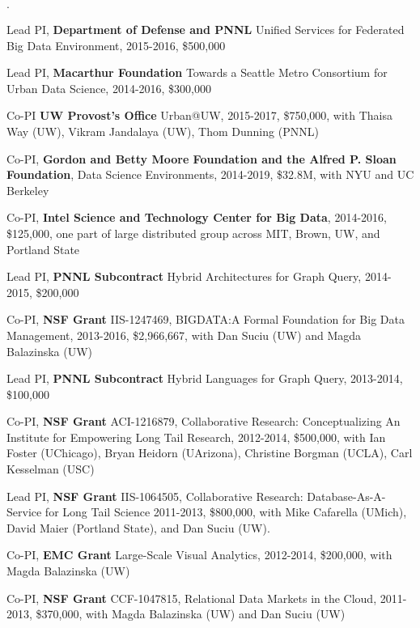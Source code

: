 \documentclass[10pt]{article}
\newenvironment{bulletlist}
   {
      \begin{list}
         {$\cdot$}
         {
            \setlength{\itemsep}{.5ex}
            \setlength{\parsep}{0ex}
            \setlength{\leftmargin}{0.7em}
            \setlength{\parskip}{0ex}
            \setlength{\topsep}{0ex}
         }
   }
   {
      \end{list}
   }
\newcommand{\marginlabel}[1]{
\begin{minipage}[b]{0.8\labelwidth}{\large \textsf{\textbf{#1}}}\end{minipage}}
\newcommand{\entrylabel}[1]{\mbox{\marginlabel{#1}}\hfill}
\newcommand{\MainListlabel}[1]
   {
      \parbox[t]{\labelwidth}{\hspace{.8em}\marginlabel{#1}}
   }
\newenvironment{MainList}[1]
   {
      \renewcommand{\entrylabel}{\MainListlabel}
      \begin{list}{}
      {
         \renewcommand{\makelabel}{\entrylabel}
         \setlength   {\itemindent}{-.65em}
         \setlength   {\labelwidth}{#1}
         \setlength   {\leftmargin}{\labelwidth}
         \setlength   {\itemsep}{3ex}
      }
   }
   {
      \end{list}
   }
\begin{document}
\begin{MainList}{88pt}
\begin{bulletlist}
\item Lead PI, {\bf Department of Defense and PNNL} Unified Services for Federated Big Data Environment, 2015-2016, \$500,000

\item Lead PI, {\bf Macarthur Foundation} Towards a Seattle Metro Consortium for Urban Data Science, 2014-2016, \$300,000

\item Co-PI {\bf UW Provost's Office} Urban@UW, 2015-2017, \$750,000, with Thaisa Way (UW), Vikram Jandalaya (UW), Thom Dunning (PNNL)

\item Co-PI, {\bf Gordon and Betty Moore Foundation and the Alfred P. Sloan Foundation}, Data Science Environments, 2014-2019, \$32.8M, with NYU and UC Berkeley

\item Co-PI, {\bf Intel Science and Technology Center for Big Data}, 2014-2016, \$125,000, one part of large distributed group across MIT, Brown, UW, and Portland State

\item Lead PI, {\bf PNNL Subcontract} Hybrid Architectures for Graph Query, 2014-2015, \$200,000

\item Co-PI, {\bf NSF Grant} IIS-1247469, BIGDATA:A Formal Foundation for Big Data Management, 2013-2016, \$2,966,667, with Dan Suciu (UW) and Magda Balazinska (UW)

\item Lead PI, {\bf PNNL Subcontract} Hybrid Languages for Graph Query, 2013-2014, \$100,000

\item Co-PI, {\bf NSF Grant} ACI-1216879, Collaborative Research: Conceptualizing An Institute for Empowering Long Tail Research, 2012-2014, \$500,000, with Ian Foster (UChicago), Bryan Heidorn (UArizona), Christine Borgman (UCLA), Carl Kesselman (USC)

\item Lead PI, {\bf NSF Grant} IIS-1064505, Collaborative Research: Database-As-A-Service for Long Tail Science
2011-2013, \$800,000, with Mike Cafarella (UMich), David Maier (Portland State), and Dan Suciu (UW).

\item Co-PI, {\bf EMC Grant} Large-Scale Visual Analytics, 2012-2014, \$200,000, with Magda Balazinska (UW)

\item Co-PI, {\bf NSF Grant} CCF-1047815, Relational Data Markets in the Cloud, 2011-2013, \$370,000, with Magda Balazinska (UW) and Dan Suciu (UW)


\end{bulletlist}
\end{MainList}
\end{document}
